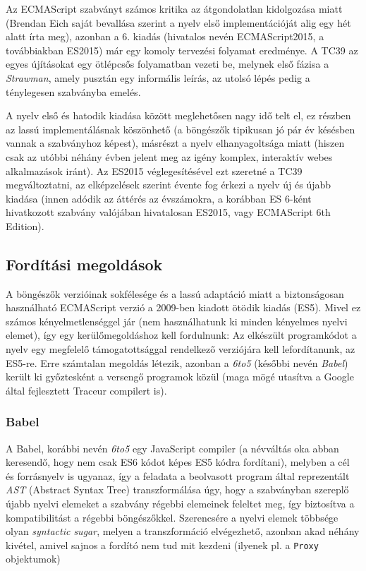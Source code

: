Az ECMAScript szabványt számos kritika az átgondolatlan kidolgozása miatt
(Brendan Eich saját bevallása szerint a nyelv első implementációját alig egy hét
alatt írta meg\cite[4. fejezet]{speakingjs}), azonban a 6. kiadás (hivatalos
nevén ECMAScript2015, a továbbiakban ES2015) már egy komoly tervezési folyamat
eredménye.  A TC39 az egyes újításokat egy ötlépcsős folyamatban vezeti
be\cite{tc39proc}, melynek első fázisa a \emph{Strawman}, amely pusztán egy
informális leírás, az utolsó lépés pedig a ténylegesen szabványba emelés.

A nyelv első és hatodik kiadása között meglehetősen nagy idő telt el, ez részben
az lassú implementálásnak köszönhető (a böngészők tipikusan jó pár év késésben
vannak a szabványhoz képest), másrészt a nyelv elhanyagoltsága miatt (hiszen
csak az utóbbi néhány évben jelent meg az igény komplex, interaktív webes
alkalmazások iránt). Az ES2015 véglegesítésével ezt szeretné a TC39
megváltoztatni, az elképzelések szerint évente fog érkezi a nyelv új és újabb
kiadása (innen adódik az áttérés az évszámokra, a korábban ES 6-ként hivatkozott
szabvány valójában hivatalosan ES2015, vagy ECMAScript 6th Edition).

\subsection{Fordítási megoldások}

A böngészők verzióinak sokfélesége és a lassú adaptáció miatt a biztonságosan
használható ECMAScript verzió a 2009-ben kiadott ötödik kiadás (ES5).  Mivel ez
számos kényelmetlenséggel jár (nem használhatunk ki minden kényelmes nyelvi
elemet), így egy kerülőmegoldáshoz kell fordulnunk: Az elkészült programkódot a
nyelv egy megfelelő támogatottsággal rendelkező verziójára kell lefordítanunk,
az ES5-re.  Erre számtalan megoldás létezik, azonban a \emph{6to5} (későbbi
nevén\cite{babelborn} \emph{Babel}) került ki győztesként a versengő programok
közül (maga mögé utasítva a Google által fejlesztett Traceur\cite{traceur}
compilert is).

\subsubsection{Babel}\label{sec:babel}

A Babel\cite{babel}, korábbi nevén \emph{6to5} egy JavaScript compiler (a
névváltás oka abban keresendő, hogy nem csak ES6 kódot képes ES5 kódra
fordítani), melyben a cél és forrásnyelv is ugyanaz, így a feladata a beolvasott
program által reprezentált \emph{AST} (Abstract Syntax Tree) transzformálása
úgy, hogy a szabványban szereplő újabb nyelvi elemeket a szabvány régebbi
elemeinek feleltet meg, így biztosítva a kompatibilitást a régebbi böngészőkkel.
Szerencsére a nyelvi elemek többsége olyan \emph{syntactic sugar}, melyen a
transzformáció elvégezhető, azonban akad néhány kivétel, amivel sajnos a fordító
nem tud mit kezdeni (ilyenek pl. a \texttt{Proxy} objektumok\cite[28.
fejezet]{exploringes6})

